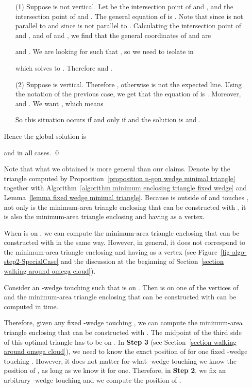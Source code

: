 \documentclass[11pt, oneside]{article}
\begin{document}
\begin{enumerate}
\item[(1)] Suppose  is not vertical.
Let  be the intersection point of  and ,
and  the intersection point of  and .
The general equation of  is .
Note that  since  is not parallel to 
and  since  is not parallel to .
Calculating the intersection point of  and ,
and of  and ,
we find that the general coordinates of  and  are

and .
We are looking for  such that ,
so we need to isolate  in

which solves to .
Therefore
 and .

\item[(2)] Suppose  is vertical.
Therefore 
,
otherwise  is not the expected line.
Using the notation of the previous case,
we get that the equation of  is .
Moreover,
 and .
We want ,
which means
 
So this situation occurs 
if and only if 
and the solution is  
and .
\end{enumerate}

Hence the global solution is
 
and 
in all cases.
\qed

Note that what we obtained
is more general than our claims.
Denote by  the triangle
computed by Proposition~\ref{proposition n-gon wedge minimal triangle}
together with Algorithm~\ref{algorithm minimum enclosing triangle fixed wedge}
and Lemma~\ref{lemma fixed wedge minimal triangle}.
Because  is outside of 
and  touches ,
not only is  the minimum-area triangle
enclosing  
that can be constructed with ,
it is also the minimum-area triangle
enclosing 
and having  as a vertex.


When  is on ,
we can compute
the minimum-area triangle
enclosing  
that can be constructed with  in the same way.
However,
in general,
it does not correspond to the minimum-area triangle
enclosing 
and having  as a vertex
(see Figure~\ref{fig algo-step2-SpecialCase}
and the discussion at the beginning of Section~\ref{section walking around omega cloud}).
\begin{corollary}
\label{corollary n-gon wedge minimal triangle}
Consider an -wedge 
touching 
such that  is on .
Then  is on one of the vertices of 
and the minimum-area triangle enclosing  
that can be constructed with 
can be computed in  time. 
\end{corollary}

Therefore,
given any fixed -wedge  touching ,
we can compute the minimum-area triangle enclosing 
that can be constructed with .
The midpoint  of the third side 
of this optimal triangle
has to be on .
In {\bf Step 3}
(see Section~\ref{section walking around omega cloud}),
we need to know the exact position of  
for one fixed -wedge touching .
However,
it does not matter
for what -wedge touching 
we know the position of ,
as long as we know it for one.
Therefore, 
in {\bf Step 2},
we fix an arbitrary -wedge  touching 
and we compute the position of .
\end{document}
